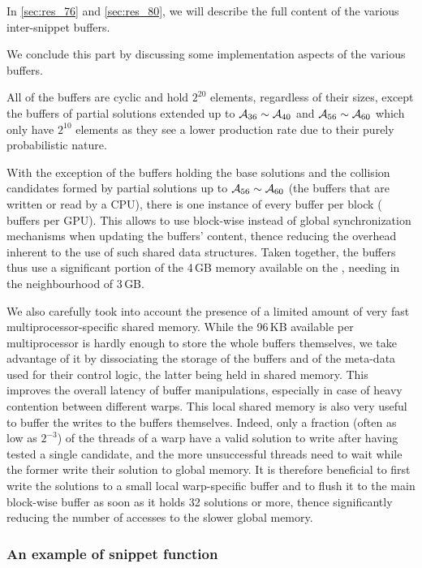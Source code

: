 In \autoref{sec:res_76} and \autoref{sec:res_80}, we will describe the full content of the various inter-snippet buffers.

\bigskip

We conclude this part by discussing some implementation aspects of the various buffers.

All of the buffers are cyclic and hold $2^{20}$ elements, regardless of their sizes, except the buffers of partial solutions extended up to
$\mathcal{A}_{36} \sim \mathcal{A}_{40}$ and $\mathcal{A}_{56} \sim \mathcal{A}_{60}$ which only have $2^{10}$ elements as they see a lower production rate due to their purely probabilistic nature.

With the exception of the buffers holding the base solutions and the collision candidates formed by partial solutions
up to $\mathcal{A}_{56} \sim \mathcal{A}_{60}$ (\ie the buffers that are written or read by a CPU),
there is one instance of every buffer per block ( buffers per GPU). This allows to use block-wise instead of global
synchronization mechanisms when updating the buffers' content,
thence reducing the overhead inherent to the use of such shared data structures.
Taken together, the buffers thus use a significant portion of the 4\,GB memory available on the \gtx, needing in the neighbourhood of 3\,GB.

We also carefully took into account the presence of a limited amount of
very fast multiprocessor-specific shared memory. While the 96\,KB available per multiprocessor is
hardly enough to store the whole buffers themselves, we take advantage of it by dissociating the storage of
the buffers and of the meta-data used for their control logic, the latter being held in
shared memory. This improves the overall latency of buffer manipulations, especially in case of
heavy contention between different warps. This local shared memory is also very useful to buffer
the writes to the buffers themselves. Indeed, only a fraction (often as low as $2^{-3}$)
of the threads of a warp have a valid solution to write after having tested a single candidate,
and the more unsuccessful threads need to wait while the former write their solution to global memory.
It is therefore beneficial to first write the solutions to a small local warp-specific buffer and to
flush it to the main block-wise buffer as soon as it holds 32 solutions or more, thence
significantly reducing the number of accesses to the slower global memory.


\subsubsection{An example of snippet function}
\label{sec:snippet}

